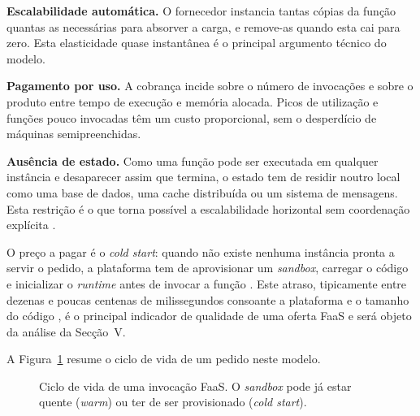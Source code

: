 \documentclass[conference]{IEEEtran}
\begin{document}
\textbf{Escalabilidade automática.} O fornecedor instancia tantas cópias da função quantas as necessárias para absorver a carga, e remove-as quando esta cai para zero. Esta elasticidade quase instantânea é o principal argumento técnico do modelo.

\textbf{Pagamento por uso.} A cobrança incide sobre o número de invocações e sobre o produto entre tempo de execução e memória alocada. Picos de utilização e funções pouco invocadas têm um custo proporcional, sem o desperdício de máquinas semipreenchidas.

\textbf{Ausência de estado.} Como uma função pode ser executada em qualquer instância e desaparecer assim que termina, o estado tem de residir noutro local como uma base de dados, uma cache distribuída ou um sistema de mensagens. Esta restrição é o que torna possível a escalabilidade horizontal sem coordenação explícita \cite{jonas2019,hellerstein2019}.

O preço a pagar é o \textit{cold start}: quando não existe nenhuma instância pronta a servir o pedido, a plataforma tem de aprovisionar um \textit{sandbox}, carregar o código e inicializar o \textit{runtime} antes de invocar a função \cite{wang2018,manner2018}. Este atraso, tipicamente entre dezenas e poucas centenas de milissegundos consoante a plataforma e o tamanho do código \cite{shahrad2020}, é o principal indicador de qualidade de uma oferta FaaS e será objeto da análise da Secção~V.

A Figura~\ref{fig:faas} resume o ciclo de vida de um pedido neste modelo.

\begin{figure}[!htbp]
\centering
{}
\caption{Ciclo de vida de uma invocação FaaS. O \textit{sandbox} pode já estar quente (\textit{warm}) ou ter de ser provisionado (\textit{cold start}).}
\label{fig:faas}
\end{figure}
\end{document}
